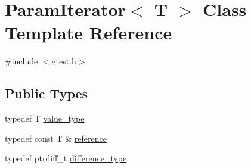 \hypertarget{classtesting_1_1internal_1_1ParamIterator}{\section{\-Param\-Iterator$<$ \-T $>$ \-Class \-Template \-Reference}
\label{d0/ddb/classtesting_1_1internal_1_1ParamIterator}
}


{\ttfamily \#include $<$gtest.\-h$>$}

\subsection*{\-Public \-Types}
\begin{DoxyCompactItemize}
\item 
typedef \-T \hyperlink{classtesting_1_1internal_1_1ParamIterator_a265a253612b46abed17c61b0a5e5ce30}{value\-\_\-type}
\item 
typedef const \-T \& \hyperlink{classtesting_1_1internal_1_1ParamIterator_a4fef7a13b0a31eb10c0ae4c731a0e2d3}{reference}
\item 
typedef ptrdiff\-\_\-t \hyperlink{classtesting_1_1internal_1_1ParamIterator_acf947bbb9e09f863cc3572ff8550b183}{difference\-\_\-type}
\end{DoxyCompactItemize}
